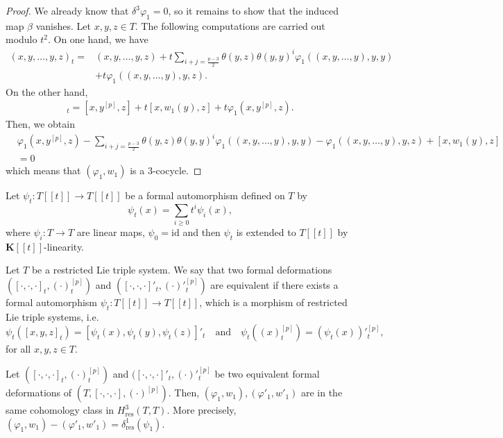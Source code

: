 \documentclass[11pt, twoside]{article}
\begin{document}
\begin{proof}

We already know that $\delta^3\varphi_1=0 $, so it remains to show that the induced map $\beta$ vanishes. Let $x,y,z\in T$. The following computations are carried out modulo $t^2$. On  one hand, we have \begin{align*}
    (x,y,\ldots,y,z)_t=& (x,y,\ldots,y,z) +t  \sum_{i+j=\frac{p-3}{2}}\theta(y,z)\theta(y,y)^i\varphi_1((x,y,\ldots,y),y,y) \\ &+t \varphi_1((x,y,\ldots,y),y,z).
\end{align*} On the other hand, \begin{align*}
    [x,(y)_t^{[p]},z]_t= [x,y^{[p]},z]+ t[x,w_1(y),z] + t\varphi_1(x,y^{[p]},z).
\end{align*} Then, we obtain  \begin{align*}
    &\varphi_1(x,y^{[p]},z)-  \sum_{i+j=\frac{p-3}{2}}\theta(y,z)\theta(y,y)^i\varphi_1((x,y,\ldots,y),y,y) - \varphi_1((x,y,\ldots,y),y,z) + [x,w_1(y),z]\\ &=0
\end{align*} which means that $(\varphi_1,w_1) $ is a $3$-cocycle.
\end{proof}

Let $\psi_t:T[[t]]\to T[[t]] $ be a formal automorphism defined on $T$ by $$\psi_t(x)= \sum\limits_{i\geq 0}t^i\psi_i(x), $$ where $\psi_i:T\to T$ are linear maps, $\psi_0=\mathrm{id}$ and then $\psi_t$ is extended to $T[[t]]$ by $\mathbf{K}[[t]] $-linearity. 

\begin{defi}
    Let $T$ be a restricted Lie triple system. We say that two formal deformations $([\cdot,\cdot,\cdot]_t,(\cdot)^{[p]}_t)$ and $([\cdot,\cdot,\cdot]'_t,(\cdot)'^{[p]}_t) $ are equivalent if there exists a formal automorphism $\psi_t:T[[t]]\to T[[t]] $, which is a morphism of restricted Lie triple systems, i.e. $$\psi_t([x,y,z]_t)=[\psi_t(x),\psi_t(y),\psi_t(z)]'_t \,\,\,\,\,\, \text{and} \,\,\,\,\,\, \psi_t((x)^{[p]}_t)=(\psi_t(x))'^{[p]}_t, $$ for all $x,y,z\in T$.
\end{defi}

\begin{thm}
    Let $([\cdot,\cdot,\cdot]_t,(\cdot)^{[p]}_t)$ and $([\cdot,\cdot,\cdot]'_t,(\cdot)'^{[p]}_t $ be two equivalent formal deformations of \newline$(T,[\cdot,\cdot,\cdot],(\cdot)^{[p]}) $. Then, $(\varphi_1,w_1), (\varphi'_1,w'_1) $ are in the same cohomology class in $H^3_\mathrm{res}(T,T) $. More precisely, $(\varphi_1,w_1)- (\varphi'_1,w'_1)=\delta^1_\mathrm{res}(\psi_1) $.
\end{thm}
\end{document}
